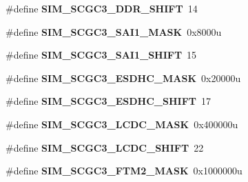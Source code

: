 \begin{DoxyCompactItemize}
\item 
\hypertarget{group___s_i_m___register___masks_ga354e0ece3b8e7311effd5937ccdd5d91}{}\#define {\bfseries S\+I\+M\+\_\+\+S\+C\+G\+C3\+\_\+\+D\+D\+R\+\_\+\+S\+H\+I\+F\+T}~14\label{group___s_i_m___register___masks_ga354e0ece3b8e7311effd5937ccdd5d91}

\item 
\hypertarget{group___s_i_m___register___masks_ga359143af1ab0b1d073ddbca5d1c61553}{}\#define {\bfseries S\+I\+M\+\_\+\+S\+C\+G\+C3\+\_\+\+S\+A\+I1\+\_\+\+M\+A\+S\+K}~0x8000u\label{group___s_i_m___register___masks_ga359143af1ab0b1d073ddbca5d1c61553}

\item 
\hypertarget{group___s_i_m___register___masks_gad8237025b77596b5a09470528552b6df}{}\#define {\bfseries S\+I\+M\+\_\+\+S\+C\+G\+C3\+\_\+\+S\+A\+I1\+\_\+\+S\+H\+I\+F\+T}~15\label{group___s_i_m___register___masks_gad8237025b77596b5a09470528552b6df}

\item 
\hypertarget{group___s_i_m___register___masks_ga6da1d21f524888dd03e6c2bb7a396870}{}\#define {\bfseries S\+I\+M\+\_\+\+S\+C\+G\+C3\+\_\+\+E\+S\+D\+H\+C\+\_\+\+M\+A\+S\+K}~0x20000u\label{group___s_i_m___register___masks_ga6da1d21f524888dd03e6c2bb7a396870}

\item 
\hypertarget{group___s_i_m___register___masks_ga4c726f34a39298ef75734b3befbda93d}{}\#define {\bfseries S\+I\+M\+\_\+\+S\+C\+G\+C3\+\_\+\+E\+S\+D\+H\+C\+\_\+\+S\+H\+I\+F\+T}~17\label{group___s_i_m___register___masks_ga4c726f34a39298ef75734b3befbda93d}

\item 
\hypertarget{group___s_i_m___register___masks_ga7b605dcdf77c399b8e40a97ab0150029}{}\#define {\bfseries S\+I\+M\+\_\+\+S\+C\+G\+C3\+\_\+\+L\+C\+D\+C\+\_\+\+M\+A\+S\+K}~0x400000u\label{group___s_i_m___register___masks_ga7b605dcdf77c399b8e40a97ab0150029}

\item 
\hypertarget{group___s_i_m___register___masks_gad628c1389943eead82f2234ecb21357b}{}\#define {\bfseries S\+I\+M\+\_\+\+S\+C\+G\+C3\+\_\+\+L\+C\+D\+C\+\_\+\+S\+H\+I\+F\+T}~22\label{group___s_i_m___register___masks_gad628c1389943eead82f2234ecb21357b}

\item 
\hypertarget{group___s_i_m___register___masks_gafe5009515ab0955d724fa5306171aeeb}{}\#define {\bfseries S\+I\+M\+\_\+\+S\+C\+G\+C3\+\_\+\+F\+T\+M2\+\_\+\+M\+A\+S\+K}~0x1000000u\label{group___s_i_m___register___masks_gafe5009515ab0955d724fa5306171aeeb}


\end{DoxyCompactItemize}
